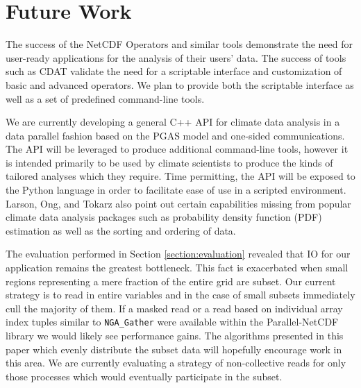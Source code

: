 \section{Future Work}
\label{section:future}

The success of the NetCDF Operators\cite{NCO} and similar tools demonstrate
the need for user-ready applications for the analysis of their users' data.  
The success of tools such as CDAT\cite{CDAT} validate the need for a
scriptable interface and customization of basic and advanced operators.  We
plan to provide both the scriptable interface as well as a set of predefined
command-line tools.

We are currently developing a general C++ API for climate data analysis in a
data parallel fashion based on the PGAS model and one-sided communications.
The API will be leveraged to produce additional command-line tools, however it
is intended primarily to be used by climate scientists to produce the kinds of
tailored analyses which they require.  Time permitting, the API will be
exposed to the Python language in order to facilitate ease of use in a
scripted environment.  Larson, Ong, and Tokarz also point out certain
capabilities missing from popular climate data analysis packages such as
probability density function (PDF) estimation as well as the sorting and
ordering of data.

The evaluation performed in Section \ref{section:evaluation} revealed that IO
for our application remains the greatest bottleneck.  This fact is exacerbated
when small regions representing a mere fraction of the entire grid are subset.
Our current strategy is to read in entire variables and in the case of small
subsets immediately cull the majority of them.  If a masked read or a read
based on individual array index tuples similar to \verb+NGA_Gather+ were
available within the Parallel-NetCDF library we would likely see performance
gains.  The algorithms presented in this paper which evenly distribute the
subset data will hopefully encourage work in this area.  We are currently
evaluating a strategy of non-collective reads for only those processes which
would eventually participate in the subset.

